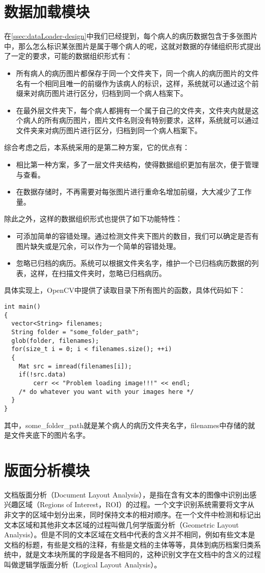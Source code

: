 \section{数据加载模块}  %
在\autoref{ssec:dataLoader-design}中我们已经提到，每个病人的病历数据包含于多张图片中，那么怎么标识某张图片是属于哪个病人的呢，这就对数据的存储组织形式提出了一定的要求，可能的数据组织形式有：
\begin{itemize}
	\item 所有病人的病历图片都保存于同一个文件夹下，同一个病人的病历图片的文件名有一个相同且唯一的前缀作为该病人的标识，这样，系统就可以通过这个前缀来对病历图片进行区分，归档到同一个病人档案下。
	\item 在最外层文件夹下，每个病人都拥有一个属于自己的文件夹，文件夹内就是这个病人的所有病历图片，图片文件名则没有特别要求，这样，系统就可以通过文件夹来对病历图片进行区分，归档到同一个病人档案下。
\end{itemize}
综合考虑之后，本系统采用的是第二种方案，它的优点有：
\begin{itemize}
	\item 相比第一种方案，多了一层文件夹结构，使得数据组织更加有层次，便于管理与查看。
	\item 在数据存储时，不再需要对每张图片进行重命名增加前缀，大大减少了工作量。
\end{itemize}
除此之外，这样的数据组织形式也提供了如下功能特性：
\begin{itemize}
	\item 可添加简单的容错处理。通过检测文件夹下图片的数目，我们可以确定是否有图片缺失或是冗余，可以作为一个简单的容错处理。
	\item 忽略已归档的病历。系统可以根据文件夹名字，维护一个已归档病历数据的列表，这样，在扫描文件夹时，忽略已归档病历。
\end{itemize}
具体实现上，OpenCV中提供了读取目录下所有图片的函数，具体代码如下：
\begin{lstlisting}
int main()
{
  vector<String> filenames;
  String folder = "some_folder_path";
  glob(folder, filenames);
  for(size_t i = 0; i < filenames.size(); ++i)
  {
    Mat src = imread(filenames[i]);
    if(!src.data)
        cerr << "Problem loading image!!!" << endl;
    /* do whatever you want with your images here */
  }
}
\end{lstlisting}
其中，some\_folder\_path就是某个病人的病历文件夹名字，filenames中存储的就是文件夹底下的图片名字。

\section{版面分析模块}  %
文档版面分析（Document Layout Analysis），是指在含有文本的图像中识别出感兴趣区域（Regions of Interest，ROI）的过程。一个文字识别系统需要将文字从非文字的区域中划分出来，同时保持文本的相对顺序\citep{baird1992anatomy}。在一个文件中检测和标记出文本区域和其他非文本区域的过程叫做几何学版面分析（Geometric Layout Analysis）\citep{cattoni1998geometric}。但是不同的文本区域在文档中代表的含义并不相同，例如有些文本是文档的标题，有些是文档的注释，有些是文档的主体等等，具体到病历档案归类系统中，就是文本块所属的字段是各不相同的，这种识别文字在文档中的含义的过程叫做逻辑学版面分析（Logical Layout Analysis）\citep{haralick1994document}。

